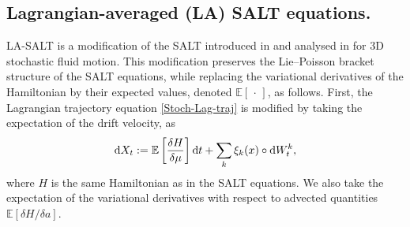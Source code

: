 \documentclass[11pt, oneside]{article}   	%
\numberwithin{equation}{section}
\theoremstyle{plain}
\theoremstyle{definition}
\theoremstyle{remark}
\newcommand{\<}{\langle}
\renewcommand{\>}{\rangle}
\def\diff{\textnormal{d}}
\newcommand{\E}[1]{\mathbb{E}\left[{#1}\right]}
\begin{document}
\subsection{Lagrangian-averaged (LA) SALT equations.}

LA-SALT is a modification of the SALT introduced in \cite{DrivasHolm2019} and analysed in \cite{DrivasHolmLeahy2020} for 3D stochastic fluid motion. This modification preserves the Lie--Poisson bracket structure of the SALT equations, while replacing the variational derivatives of the Hamiltonian by their expected values, denoted $\mathbb{E}[\,\cdot\,]$, as follows. First, the Lagrangian trajectory equation \eqref{Stoch-Lag-traj} is modified by taking the expectation of the drift velocity, as  
\begin{align}
\diff{X_t} := 
\E{\frac{\delta H }{\delta \mu}} \diff t + \displaystyle\sum_k\xi_k(x)\circ \diff W_t^k,
\label{Exp-Lag-traj}
\end{align}
where $H$ is the same Hamiltonian as in the SALT equations. We also take the expectation of the variational derivatives with respect to advected quantities $\E{{\delta H }/{\delta a}}$.
\end{document}
